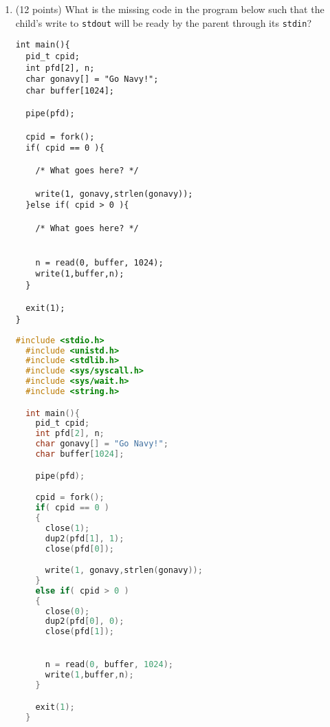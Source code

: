 \documentclass{article}[9pt]
\newenvironment{answerfont}{\fontfamily{qhv}\selectfont}{\par}
\newenvironment{myanswer}{\begin{mdframed}\begin{answerfont}}{\end{answerfont}\end{mdframed}}
\begin{document}
\begin{enumerate}
\begin{verbatim}
int main(){
  int fd_in = open("fight.txt",O_RDONLY);

  int fd_out = open("output.txt",O_WRONLY | O_TRUNC | O_CREAT,0755);
  char buf[1024];

  close(0);
  dup2(fd_in,0);

  close(1);
  dup2(fd_out,1);

  while(scanf("%s",buf) != EOF){
    printf("%s\n",buf);
  }

  return 0;
}
\end{verbatim}

  \begin{myanswer}
  When the close(1) happens, an eof is hit and the while loop is never begun.
  \end{myanswer}


\item (12 points) What is the missing code in the program below such that the
child's write to \texttt{stdout} will be ready by the parent through
its \texttt{stdin}?

\begin{verbatim}
int main(){
  pid_t cpid;
  int pfd[2], n;
  char gonavy[] = "Go Navy!";
  char buffer[1024];

  pipe(pfd);

  cpid = fork();
  if( cpid == 0 ){

    /* What goes here? */

    write(1, gonavy,strlen(gonavy));
  }else if( cpid > 0 ){

    /* What goes here? */


    n = read(0, buffer, 1024);
    write(1,buffer,n);
  }

  exit(1);
}
\end{verbatim}

  \begin{myanswer}
  \begin{lstlisting}[language=c]
  #include <stdio.h>
  #include <unistd.h>
  #include <stdlib.h>
  #include <sys/syscall.h>
  #include <sys/wait.h>
  #include <string.h>

  int main(){
    pid_t cpid;
    int pfd[2], n;
    char gonavy[] = "Go Navy!";
    char buffer[1024];

    pipe(pfd);

    cpid = fork();
    if( cpid == 0 )
    {
      close(1);
      dup2(pfd[1], 1);
      close(pfd[0]);

      write(1, gonavy,strlen(gonavy));
    }
    else if( cpid > 0 )
    {
      close(0);
      dup2(pfd[0], 0);
      close(pfd[1]);


      n = read(0, buffer, 1024);
      write(1,buffer,n);
    }

    exit(1);
  }
  \end{lstlisting}
  \end{myanswer}


\end{enumerate}
\end{document}
